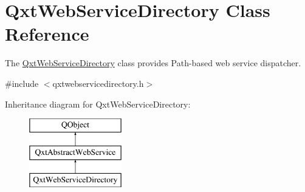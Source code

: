 \hypertarget{class_qxt_web_service_directory}{\section{Qxt\-Web\-Service\-Directory Class Reference}
\label{class_qxt_web_service_directory}
}


The \hyperlink{class_qxt_web_service_directory}{Qxt\-Web\-Service\-Directory} class provides Path-\/based web service dispatcher.  




{\ttfamily \#include $<$qxtwebservicedirectory.\-h$>$}

Inheritance diagram for Qxt\-Web\-Service\-Directory\-:\begin{figure}[H]
\begin{center}
\leavevmode
\includegraphics[height=3.000000cm]{class_qxt_web_service_directory}
\end{center}
\end{figure}
